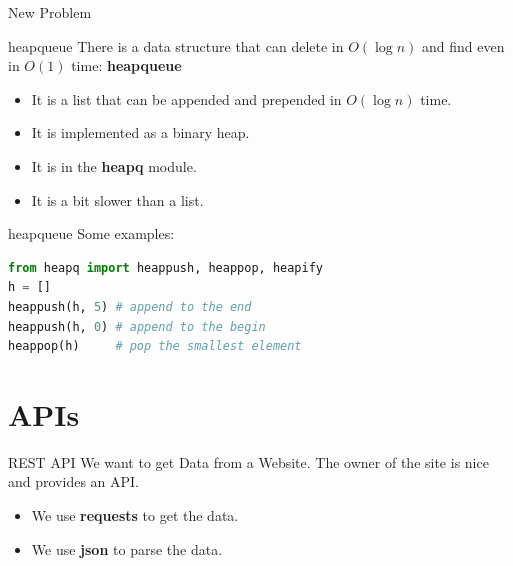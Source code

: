 \documentclass{beamer}
\begin{document}
\begin{frame}{New Problem}
{\begin{figure}
        \end{figure}}
    \end{frame}

    \begin{frame}{heapqueue}
        There is a data structure that can delete in $O(\log n)$ and find even in $O(1)$ time: \textbf{heapqueue}\pause
        \begin{itemize}
            \item It is a list that can be appended and prepended in $O(\log n)$ time.
            \item It is implemented as a binary heap.
            \item It is in the \textbf{heapq} module.
            \item It is a bit slower than a list.
        \end{itemize}
        
    \end{frame}

    \begin{frame}[fragile]{heapqueue}
        Some examples:
        \begin{lstlisting}[language=Python, backgroundcolor = \color{lightgray}]
from heapq import heappush, heappop, heapify
h = []
heappush(h, 5) # append to the end
heappush(h, 0) # append to the begin
heappop(h)     # pop the smallest element
        \end{lstlisting}
        \end{frame}

        \section{APIs}
        \begin{frame}{REST API}
            We want to get Data from a Website.\pause
            The owner of the site is nice and provides an API.\pause
            \begin{itemize}
                \item We use \textbf{requests} to get the data.
                \item We use \textbf{json} to parse the data.
            \end{itemize}
        \end{frame}
\end{document}
